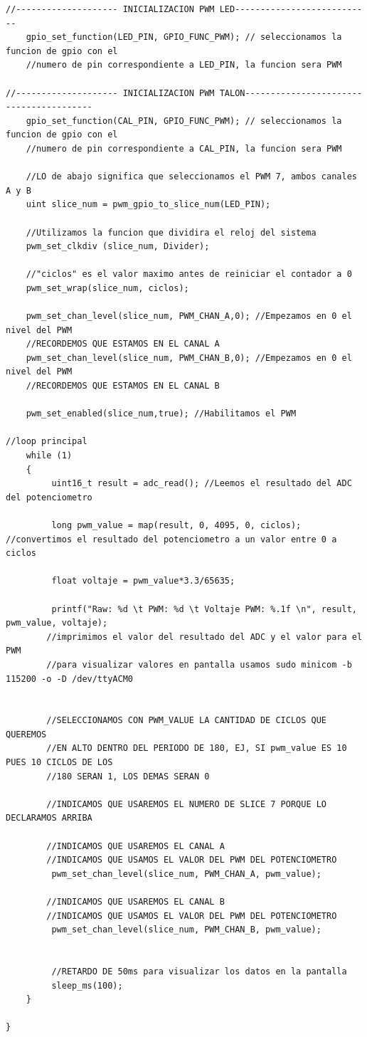 \documentclass[12pt]{book} %
\begin{document}
\begin{lstlisting}
//-------------------- INICIALIZACION PWM LED---------------------------
    gpio_set_function(LED_PIN, GPIO_FUNC_PWM); // seleccionamos la funcion de gpio con el 
    //numero de pin correspondiente a LED_PIN, la funcion sera PWM
    
//-------------------- INICIALIZACION PWM TALON----------------------------------------
    gpio_set_function(CAL_PIN, GPIO_FUNC_PWM); // seleccionamos la funcion de gpio con el 
    //numero de pin correspondiente a CAL_PIN, la funcion sera PWM

    //LO de abajo significa que seleccionamos el PWM 7, ambos canales A y B
    uint slice_num = pwm_gpio_to_slice_num(LED_PIN);
    
    //Utilizamos la funcion que dividira el reloj del sistema
    pwm_set_clkdiv (slice_num, Divider);

    //"ciclos" es el valor maximo antes de reiniciar el contador a 0
    pwm_set_wrap(slice_num, ciclos);

    pwm_set_chan_level(slice_num, PWM_CHAN_A,0); //Empezamos en 0 el nivel del PWM
    //RECORDEMOS QUE ESTAMOS EN EL CANAL A
    pwm_set_chan_level(slice_num, PWM_CHAN_B,0); //Empezamos en 0 el nivel del PWM
    //RECORDEMOS QUE ESTAMOS EN EL CANAL B

    pwm_set_enabled(slice_num,true); //Habilitamos el PWM

//loop principal
    while (1)
    {
         uint16_t result = adc_read(); //Leemos el resultado del ADC del potenciometro

         long pwm_value = map(result, 0, 4095, 0, ciclos); //convertimos el resultado del potenciometro a un valor entre 0 a ciclos
         
         float voltaje = pwm_value*3.3/65635;

         printf("Raw: %d \t PWM: %d \t Voltaje PWM: %.1f \n", result, pwm_value, voltaje);
        //imprimimos el valor del resultado del ADC y el valor para el PWM 
        //para visualizar valores en pantalla usamos sudo minicom -b 115200 -o -D /dev/ttyACM0


        //SELECCIONAMOS CON PWM_VALUE LA CANTIDAD DE CICLOS QUE QUEREMOS 
        //EN ALTO DENTRO DEL PERIODO DE 180, EJ, SI pwm_value ES 10 PUES 10 CICLOS DE LOS 
        //180 SERAN 1, LOS DEMAS SERAN 0

        //INDICAMOS QUE USAREMOS EL NUMERO DE SLICE 7 PORQUE LO DECLARAMOS ARRIBA
        
        //INDICAMOS QUE USAREMOS EL CANAL A
        //INDICAMOS QUE USAMOS EL VALOR DEL PWM DEL POTENCIOMETRO
         pwm_set_chan_level(slice_num, PWM_CHAN_A, pwm_value);
         
        //INDICAMOS QUE USAREMOS EL CANAL B
        //INDICAMOS QUE USAMOS EL VALOR DEL PWM DEL POTENCIOMETRO
         pwm_set_chan_level(slice_num, PWM_CHAN_B, pwm_value);
         
         
         //RETARDO DE 50ms para visualizar los datos en la pantalla
         sleep_ms(100);
    }
    
}

\end{lstlisting}
\end{document}
